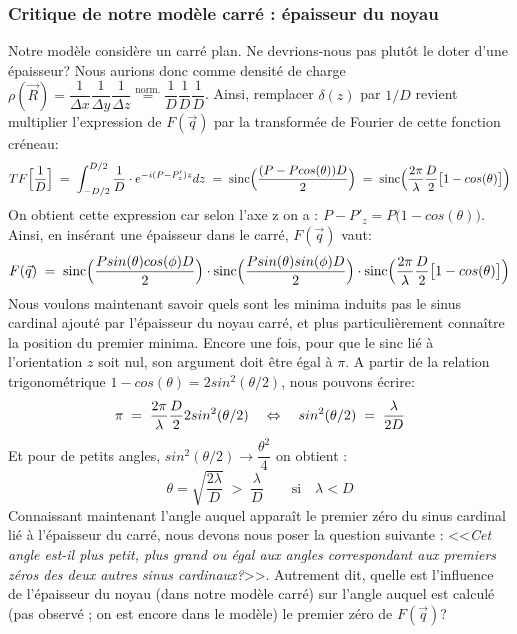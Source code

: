     \subsubsection{Critique de notre modèle carré : épaisseur du noyau}


Notre modèle considère un carré plan. Ne devrions-nous pas plutôt le doter d'une épaisseur? Nous aurions donc comme densité de charge $\rho(\vec{R}) = \dfrac{1}{\Delta x}\dfrac{1}{\Delta y} \dfrac{1}{\Delta z} \overset{\text{norm.}}= \dfrac{1}{D}\dfrac{1}{D} \dfrac{1}{D}$. Ainsi, remplacer $\delta(z)$ par $1/D$ revient multiplier l'expression de $F(\vec{q})$ par la transformée de Fourier de cette fonction créneau:
\begin{equation*}
    TF\Big[ \dfrac{1}{D} \Big] \; = \;
    \int_{-D/2}^{D/2}\dfrac{1}{D} \cdot e^{-i(P-P'_z)z} dz
    \; = \;
    \text{sinc}\Big(\dfrac{(P - P cos(\theta))D}{2}\Big)
    \; = \;
    \text{sinc}\Big(\dfrac{2\pi}{\lambda} \dfrac{D}{2} 
    \big[ 1-cos(\theta) \big]\Big)
\end{equation*}
On obtient cette expression car selon l'axe z on a : $P - P'_z = P\Big(1 - cos(\theta) \Big)$. Ainsi, en insérant une épaisseur dans le carré, $F(\vec{q})$ vaut:
\begin{equation*}
    F(\vec{q}) \; = \; 
    \text{sinc}\Big(\dfrac{P sin(\theta)cos(\phi)D}{2}\Big) \cdot
    \text{sinc}\Big(\dfrac{P sin(\theta)sin(\phi)D}{2}\Big) \cdot
    \text{sinc}\Big(\dfrac{2\pi}{\lambda} \dfrac{D}{2} 
    \big[ 1-cos(\theta) \big]\Big)
\end{equation*}
Nous voulons maintenant savoir quels sont les minima induits pas le sinus cardinal ajouté par l'épaisseur du noyau carré, et plus particulièrement connaître la position du premier minima. Encore une fois, pour que le sinc lié à l'orientation $z$ soit nul, son argument doit être égal à $\pi$.
A partir de la relation trigonométrique $1-cos(\theta) = 2sin^2(\theta /2)$, nous pouvons écrire:
\begin{equation*}
    \pi \; = \;
    \dfrac{2\pi}{\lambda} \dfrac{D}{2}
    2 sin^2(\theta /2)
    \quad \Leftrightarrow \quad
    sin^2(\theta /2) \; = \; \dfrac{\lambda}{2D}
\end{equation*}
Et pour de petits angles, $sin^2(\theta /2) \rightarrow \dfrac{\theta^2}{4}$ on obtient :
\begin{equation*}
    \theta = \sqrt{\dfrac{2\lambda}{D}} \; > \; \dfrac{\lambda}{D}
    \qquad \text{si} \quad \lambda < D
\end{equation*}
Connaissant maintenant l'angle auquel apparaît le premier zéro du sinus cardinal lié à l'épaisseur du carré, nous devons nous poser la question suivante : <<\textit{Cet angle est-il plus petit, plus grand ou égal aux angles correspondant aux premiers zéros des deux autres sinus cardinaux?}>>. Autrement dit, quelle est l'influence de l'épaisseur du noyau (dans notre modèle carré) sur l'angle auquel est calculé (pas observé ; on est encore dans le modèle) le premier zéro de $F(\vec{q})$?\\

